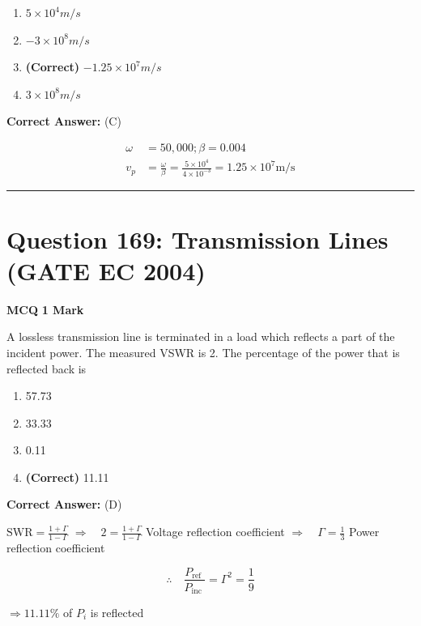 \documentclass[11pt,a4paper]{article}
\begin{document}
\begin{enumerate}[label=(\Alph*)]
    \item $5 \times 10^{4}m/s$
    \item $-3 \times 10^{8}m/s$
    \item \textbf{(Correct)} $-1.25 \times 10^{7}m/s$
    \item $3 \times 10^{8}m/s$
\end{enumerate}

\noindent \textbf{Correct Answer:} (C)

\begin{tcolorbox}[solbox, title=Detailed Solution -- Question 168]
\[
\begin{aligned} \omega&=50,000 ; \beta=0.004 \\ v_{p}&=\frac{\omega}{\beta}=\frac{5 \times 10^{4}}{4 \times 10^{-3}}=1.25 \times 10^{7} \mathrm{m} / \mathrm{s} \end{aligned}
\]
\end{tcolorbox}

\vspace{1.5em}
\hrule
\vspace{1.5em}

\section*{Question 169: Transmission Lines (GATE EC 2004)}
\noindent \textbf{\color{primary}MCQ} \hfill \textbf{\color{secondary}1 Mark}


\noindent A lossless transmission line is terminated in a load which reflects a part of the incident power. The measured VSWR is 2. The percentage of the power that is reflected back is


\begin{enumerate}[label=(\Alph*)]
    \item 57.73
    \item 33.33
    \item 0.11
    \item \textbf{(Correct)} 11.11
\end{enumerate}

\noindent \textbf{Correct Answer:} (D)

\begin{tcolorbox}[solbox, title=Detailed Solution -- Question 169]
$\mathrm{SWR}=\frac{1+\Gamma}{1-\Gamma}$
$\Rightarrow \quad 2=\frac{1+\Gamma}{1-\Gamma}$
 Voltage reflection coefficient
$\Rightarrow \quad \Gamma=\frac{1}{3}$
 Power reflection coefficient

\[
\therefore \quad \frac{P_{\text {ref }}}{P_{\text {inc }}}=\Gamma^{2}=\frac{1}{9}
\]

$\Rightarrow 11.11 \%$ of $P_{i}$ is reflected
\end{tcolorbox}
\end{document}
